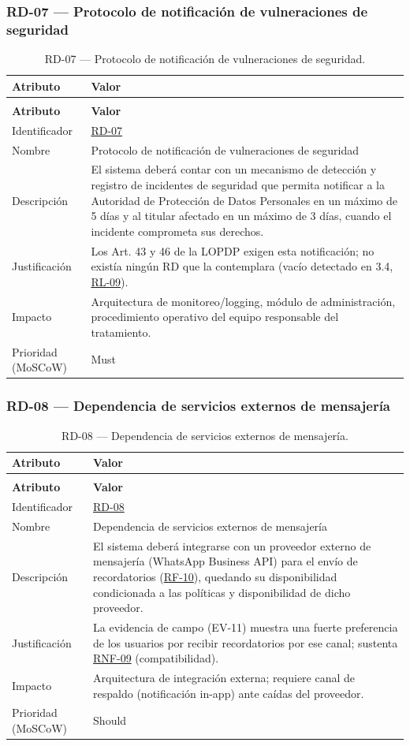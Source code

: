 \documentclass[journal,onecolumn]{IEEEtran}
\makeatletter
\newenvironment{atributos}[2]{%
	\small
	\begin{longtable}{@{}>{\raggedright\arraybackslash}p{4.2cm} >{\raggedright\arraybackslash}p{11.2cm}@{}}
		\caption{#2}\label{tab:#1}\\
		\toprule
		\textbf{Atributo} & \textbf{Valor} \\
		\midrule
		\endfirsthead
		\multicolumn{2}{@{}l}{\small\itshape (continuación)}\\
		\toprule
		\textbf{Atributo} & \textbf{Valor} \\
		\midrule
		\endhead
		\bottomrule
		\endlastfoot
	}{%
	\end{longtable}
	\normalsize
}
\makeatother
\begin{document}
	
	\subsubsection{RD-07 --- Protocolo de notificación de vulneraciones de seguridad}
	
	\begin{atributos}{RD-07}{RD-07 --- Protocolo de notificación de vulneraciones de seguridad.}
		Identificador & \hyperref[tab:RD-07]{RD-07} \\
		Nombre & Protocolo de notificación de vulneraciones de seguridad \\
		Descripción & El sistema deberá contar con un mecanismo de detección y registro de incidentes de seguridad que permita notificar a la Autoridad de Protección de Datos Personales en un máximo de 5 días y al titular afectado en un máximo de 3 días, cuando el incidente comprometa sus derechos. \\
		Justificación & Los Art. 43 y 46 de la LOPDP exigen esta notificación; no existía ningún RD que la contemplara (vacío detectado en 3.4, \hyperref[rl:09]{RL-09}). \\
		Impacto & Arquitectura de monitoreo/logging, módulo de administración, procedimiento operativo del equipo responsable del tratamiento. \\
		Prioridad (MoSCoW) & Must \\
	\end{atributos}
	
	\subsubsection{RD-08 --- Dependencia de servicios externos de mensajería}
	
	\begin{atributos}{RD-08}{RD-08 --- Dependencia de servicios externos de mensajería.}
		Identificador & \hyperref[tab:RD-08]{RD-08} \\
		Nombre & Dependencia de servicios externos de mensajería \\
		Descripción & El sistema deberá integrarse con un proveedor externo de mensajería (WhatsApp Business API) para el envío de recordatorios (\hyperref[tab:RF-10]{RF-10}), quedando su disponibilidad condicionada a las políticas y disponibilidad de dicho proveedor. \\
		Justificación & La evidencia de campo (EV-11) muestra una fuerte preferencia de los usuarios por recibir recordatorios por ese canal; sustenta \hyperref[tab:RNF-09]{RNF-09} (compatibilidad). \\
		Impacto & Arquitectura de integración externa; requiere canal de respaldo (notificación in-app) ante caídas del proveedor. \\
		Prioridad (MoSCoW) & Should \\
	\end{atributos}
	
\end{document}
